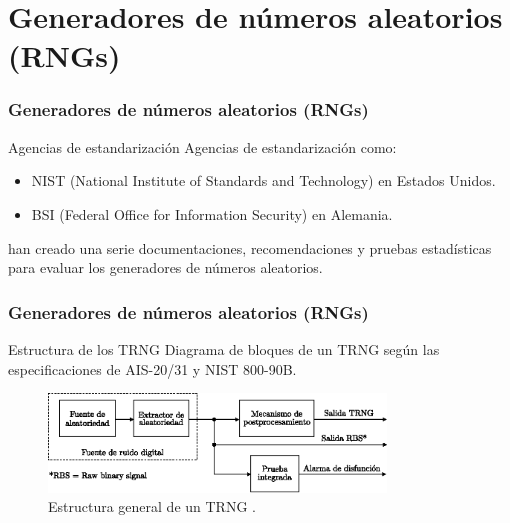 \documentclass[10pt]{beamer}
\begin{document}
\section{Generadores de números aleatorios (RNGs)}

\begin{frame}
    \frametitle{Generadores de números aleatorios (RNGs)}
    \begin{block}{Agencias de estandarización}
        \justifying
        Agencias de estandarización como:
        \begin{itemize}
            \item NIST (National Institute of Standards and Technology) \cite{Turan2018} en Estados Unidos.
            \item BSI (Federal Office for Information Security) \cite{AIS2011} en Alemania.
        \end{itemize}
        han creado una serie documentaciones, recomendaciones y pruebas estadísticas para evaluar los generadores de números aleatorios.
	\end{block}

\end{frame}


\begin{frame}
    \frametitle{Generadores de números aleatorios (RNGs)}
    \begin{block}{Estructura de los TRNG}
        \justifying
        Diagrama de bloques de un TRNG según las especificaciones de AIS-20/31 y NIST 800-90B.
	\end{block}
	
	\begin{figure}[hbtp]
	    \centering
	    \includegraphics[width=0.8\textwidth]{A0_TRNG_estructura}
	    \caption{Estructura general de un TRNG \cite{Badrignans2011}.}
        \label{fig:A1_TRNG_estructura}
    \end{figure}
\end{frame}
\end{document}

